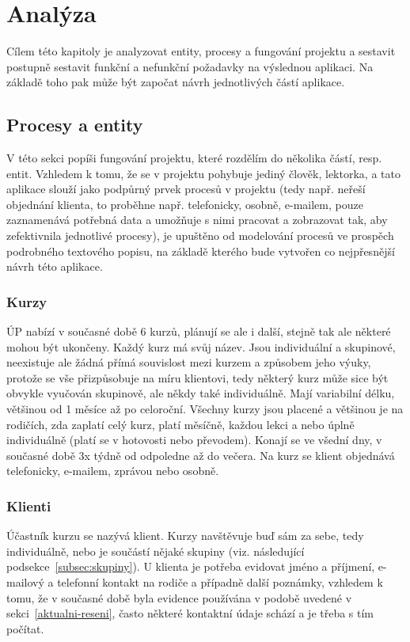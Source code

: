 \chapter{Analýza}
Cílem této kapitoly je analyzovat entity, procesy a fungování projektu a sestavit postupně sestavit funkční a nefunkční požadavky na výslednou aplikaci. Na základě toho pak může být započat návrh jednotlivých částí aplikace.
    
    \section{Procesy a entity}
    V této sekci popíši fungování projektu, které rozdělím do několika částí, resp. entit. Vzhledem k tomu, že se v projektu pohybuje jediný člověk, lektorka, a tato aplikace slouží jako podpůrný prvek procesů v projektu (tedy např. neřeší objednání klienta, to proběhne např. telefonicky, osobně, e-mailem, pouze zaznamenává potřebná data a umožňuje s nimi pracovat a zobrazovat tak, aby zefektivnila jednotlivé procesy), je upuštěno od modelování procesů ve prospěch podrobného textového popisu, na základě kterého bude vytvořen co nejpřesnější návrh této aplikace.
    
        \subsection{Kurzy}\label{subsec:kurzy}
        ÚP nabízí v současné době 6 kurzů, plánují se ale i další, stejně tak ale některé mohou být ukončeny. Každý kurz má svůj název. Jsou individuální a skupinové, neexistuje ale žádná přímá souvislost mezi kurzem a způsobem jeho výuky, protože se vše přizpůsobuje na míru klientovi, tedy některý kurz může sice být obvykle vyučován skupinově, ale někdy také individuálně. Mají variabilní délku, většinou od 1 měsíce až po celoroční. Všechny kurzy jsou placené a většinou je na rodičích, zda zaplatí celý kurz, platí měsíčně, každou lekci a nebo úplně individuálně (platí se v hotovosti nebo převodem). Konají se ve všední dny, v současné době 3x týdně od odpoledne až do večera. Na kurz se klient objednává telefonicky, e-mailem, zprávou nebo osobně.
        
        \subsection{Klienti}\label{subsec:klienti}
        Účastník kurzu se nazývá klient. Kurzy navštěvuje buď sám za sebe, tedy individuálně, nebo je součástí nějaké skupiny (viz. následující podsekce~\ref{subsec:skupiny}). U klienta je potřeba evidovat jméno a příjmení, e-mailový a telefonní kontakt na rodiče a případně další poznámky, vzhledem k tomu, že v současné době byla evidence používána v podobě uvedené v sekci~\ref{aktualni-reseni}, často některé kontaktní údaje schází a je třeba s tím počítat.
        
